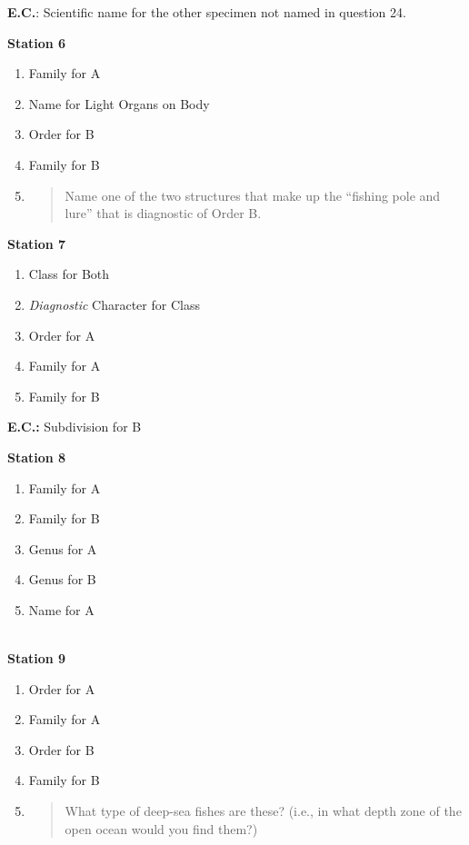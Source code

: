 \textbf{E.C.}: Scientific name for the other specimen not named in
question 24.

\textbf{Station 6}

\begin{enumerate}
\def\labelenumi{\arabic{enumi}.}
\setcounter{enumi}{24}
\item
  Family for A
\item
  Name for Light Organs on Body
\item
  Order for B
\item
  Family for B
\item
  \begin{quote}
  Name one of the two structures that make up the ``fishing pole and
  lure'' that is diagnostic of Order B.
  \end{quote}
\end{enumerate}

\textbf{Station 7}

\begin{enumerate}
\def\labelenumi{\arabic{enumi}.}
\setcounter{enumi}{29}
\item
  Class for Both
\item
  \emph{Diagnostic} Character for Class
\item
  Order for A
\item
  Family for A
\item
  Family for B
\end{enumerate}

\textbf{E.C.:} Subdivision for B

\textbf{Station 8}

\begin{enumerate}
\def\labelenumi{\arabic{enumi}.}
\setcounter{enumi}{34}
\item
  Family for A
\item
  Family for B
\item
  Genus for A
\item
  Genus for B
\item
  Name for A
\end{enumerate}

\textbf{\\
Station 9}

\begin{enumerate}
\def\labelenumi{\arabic{enumi}.}
\setcounter{enumi}{39}
\item
  Order for A
\item
  Family for A
\item
  Order for B
\item
  Family for B
\item
  \begin{quote}
  What type of deep-sea fishes are these? (i.e., in what depth zone of
  the open ocean would you find them?)
  \end{quote}
\end{enumerate}

